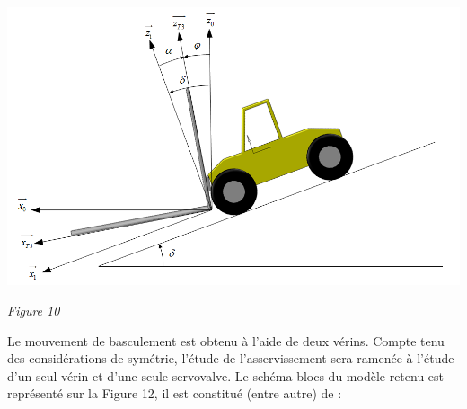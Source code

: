 \documentclass[10pt,fleqn]{article} %
\begin{document}
\begin{center}
\includegraphics[width=.8\linewidth]{images/fig_10}

\textit{Figure 10}
\end{center}
%
%
%
%
%
%
Le mouvement de basculement est obtenu à l’aide de deux vérins. Compte tenu des considérations de symétrie, l’étude de l’asservissement sera ramenée à l’étude d’un seul vérin et d’une seule servovalve.
Le schéma-blocs du modèle retenu est représenté sur la Figure 12, il est constitué (entre autre) de :
\end{document}
